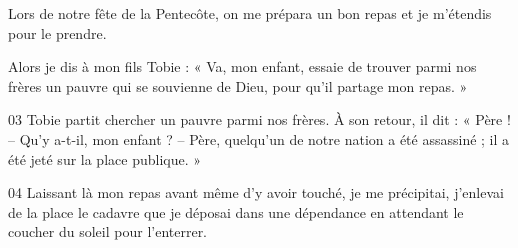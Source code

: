 Lors de notre fête de la Pentecôte, on me prépara un bon repas et je m’étendis pour le prendre.

Alors je dis à mon fils Tobie : « Va, mon enfant, essaie de trouver parmi nos frères un pauvre qui se souvienne de Dieu, pour qu’il partage mon repas. »

03 Tobie partit chercher un pauvre parmi nos frères. À son retour, il dit : « Père ! – Qu’y a-t-il, mon enfant ? – Père, quelqu’un de notre nation a été assassiné ; il a été jeté sur la place publique. »

04 Laissant là mon repas avant même d’y avoir touché, je me précipitai, j’enlevai de la place le cadavre que je déposai dans une dépendance en attendant le coucher du soleil pour l’enterrer.
